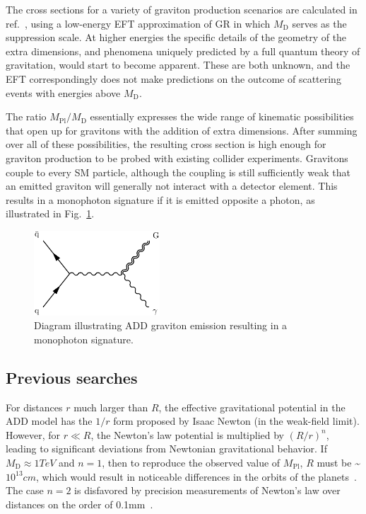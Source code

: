 \documentclass[oneside, letterpaper, 12pt, oldfontcommands]{memoir}
\begin{document}
The cross sections for a variety of graviton production scenarios are calculated in ref.~\cite{ref:S0550-3213(99)00044-9}, using a low-energy EFT
approximation of GR in which $M_\mathrm{D}$ serves as the suppression scale. At higher energies the specific details of the geometry of the extra dimensions,
and phenomena uniquely predicted by a full quantum theory of gravitation, would start to become apparent. These are both unknown, and the EFT correspondingly
does not make predictions on the outcome of scattering events with energies above $M_\mathrm{D}$.

The ratio $M_\mathrm{Pl} / M_\mathrm{D}$ essentially expresses the wide range of kinematic possibilities that open up for gravitons with the addition
of extra dimensions. After summing over all of these possibilities, the resulting
cross section is high enough for graviton production to be probed with existing collider experiments.
Gravitons couple to every SM particle, although the coupling is still sufficiently weak that an emitted graviton will generally not interact with a detector element.
This results in a monophoton signature if it is emitted opposite a photon, as illustrated in Fig.~\ref{fig:add_diagram}.

\begin{figure}[hbtp]
  \begin{center}
    \includegraphics[width=0.42\textwidth]{Figures/add.pdf}
    \caption{
      Diagram illustrating ADD graviton emission resulting in a monophoton signature.
    }
    \label{fig:add_diagram}
  \end{center}
\end{figure}

\subsection{Previous searches} \label{sec:introduction_ADD_previous_searches}
For distances $r$ much larger than $R$, the effective gravitational potential in the ADD model has the $1/r$ form proposed by Isaac Newton (in the weak-field limit).
However, for $r \ll R$, the Newton's law potential is multiplied by $(R/r)^{n}$, leading to significant deviations from Newtonian gravitational behavior.
If $M_\mathrm{D} \approx 1\unit{TeV}$ and $n = 1$, then to reproduce the observed value of $M_\mathrm{Pl}$, $R$ must be \textasciitilde$10^{13}\unit{cm}$, which
would result in noticeable differences in the orbits of the planets~\cite{ref:S0370-2693(98)00466-3}. The case $n = 2$ is disfavored by precision
measurements of Newton's law over distances on the order of 0.1\unit{mm}~\cite{ref:0264-9381/32/3/033001}.
\end{document}
